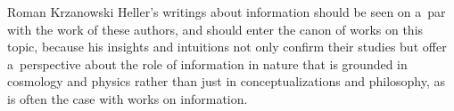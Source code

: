 \begin{artengenv}{Roman Krzanowski}
Heller's writings about information should be seen on a~par with the work of these authors, and should enter the canon of works on this topic, because his insights and intuitions not only confirm their studies but offer a~perspective about the role of information in nature that is grounded in cosmology and physics rather than just in conceptualizations and philosophy, as is often the case with works on information.



\end{artengenv}

